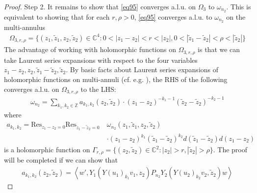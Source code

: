 \documentclass[11pt,b5paper,notitlepage]{article}
\theoremstyle{definition}
\theoremstyle{plain}
\newcommand{\wtd}{\widetilde}
\newcommand{\Res}{\mathrm{Res}}
\newcommand{\Cbb}{\mathbb C}
\newcommand{\Zbb}{\mathbb Z}
\newcommand{\<}{\left\langle}
\renewcommand{\>}{\right\rangle}
\numberwithin{equation}{section}
\begin{document}
\begin{proof}
Step 2. It remains to show that \eqref{eq95} converges a.l.u. on $\Omega_3$ to $\omega_{n_2}$. This is equivalent to showing that for each $r,\rho>0$, \eqref{eq95} converges a.l.u. to $\omega_{n_2}$ on the multi-annulus
\begin{align}
\Omega_{3,r,\rho}=\{(z_1,\wtd z_1,z_2,\wtd z_2)\in\Cbb^4:0<|z_1-z_2|<r<|z_2|,0<|\wtd z_1-\wtd z_2|<\rho<|\wtd z_2|\}
\end{align}
The advantage of working with holomorphic functions on $\Omega_{3,r,\rho}$ is that we can take Laurent series expansions with respect to the four variables $z_1-z_2,z_2,\wtd z_1-\wtd z_2,\wtd z_2$. By basic facts about Laurent series expansions of holomorphic functions on multi-annuli (cf. e.g. \cite[Lem. 7.13]{GuiLec}), the RHS of the following converges a.l.u. on $\Omega_{3,r,\rho}$ to the LHS:
\begin{align*}
\omega_{n_2}=\sum_{k_1,k_2\in\Zbb} a_{k_1,k_2}(z_2,\wtd z_2)\cdot (z_1-z_2)^{-k_1-1}(\wtd z_2-\wtd z_2)^{-k_2-1}
\end{align*}
where
\begin{align*}
a_{k_1,k_2}=\Res_{z_1-z_2=0}\Res_{\wtd z_1-\wtd z_2=0}~&\omega_{n_2}(z_1,\wtd z_1,z_2,\wtd z_2)\\
&\cdot (z_1-z_2)^{k_1}(\wtd z_1-\wtd z_2)^{k_2}d(\wtd z_1-\wtd z_2)d(z_1-z_2)
\end{align*}
is a holomorphic function on $\Gamma_{r,\rho}=\{(z_2,\wtd z_2)\in\Cbb^2:|z_2|>r,|\wtd z_2|>\rho\}$. The proof will be completed if we can show that
\begin{align}
a_{k_1,k_2}(z_2,\wtd z_2)=\<w',Y_1(Y(u_1)_{k_1}v_1,z_2)P_{n_2}Y_2(Y(u_2)_{k_2}v_2,\wtd z_2)w\>  \label{eq97}
\end{align}



\end{proof}
\end{document}
